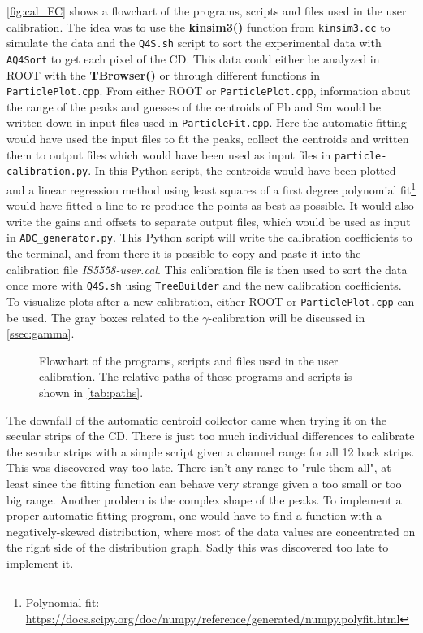 \documentclass[twoside,english]{uiofysmaster/uiofysmaster}
\newcommand{\ga}{$\gamma$}
\let\orgautoref\autoref
\renewcommand{\autoref}
        {%
		 \def\subsectionautorefname{Section}%
		 \def\subsubsectionautorefname{Section}%
          \orgautoref}
\begin{document}
\autoref{fig:cal_FC} shows a flowchart of the programs, scripts and files used in the user calibration. 
The idea was to use the \textbf{kinsim3()} function from \texttt{kinsim3.cc} to simulate the data and the \texttt{Q4S.sh} script to sort the experimental data with \texttt{AQ4Sort} to get each pixel of the CD. 
This data could either be analyzed in ROOT with the \textbf{TBrowser()} or through different functions in \texttt{ParticlePlot.cpp}. 
From either ROOT or \texttt{ParticlePlot.cpp}, information about the range of the peaks and guesses of the centroids of Pb and Sm would be written down in input files used in \texttt{ParticleFit.cpp}. 
Here the automatic fitting would have used the input files to fit the peaks, collect the centroids and written them to output files which would have been used as input files in \texttt{particle-calibration.py}. 
In this Python script, the centroids would have been plotted and a linear regression method using least squares of a first degree polynomial fit\footnote{Polynomial fit: \url{https://docs.scipy.org/doc/numpy/reference/generated/numpy.polyfit.html}} would have fitted a line to re-produce the points as best as possible. 
It would also write the gains and offsets to separate output files, which would be used as input in \texttt{ADC\_generator.py}. 
This Python script will write the calibration coefficients to the terminal, and from there it is possible to copy and paste it into the calibration file \textit{IS5558-user.cal}. 
This calibration file is then used to sort the data once more with \texttt{Q4S.sh} using \texttt{TreeBuilder} and the new calibration coefficients.
To visualize plots after a new calibration, either ROOT or \texttt{ParticlePlot.cpp} can be used. 
The gray boxes related to the \ga-calibration will be discussed in \autoref{ssec:gamma}.

\begin{figure}[ht]
	\centering
	
	\caption{Flowchart of the programs, scripts and files used in the user calibration. The relative paths of these programs and scripts is shown in \autoref{tab:paths}.}
	\label{fig:cal_FC}
\end{figure}

The downfall of the automatic centroid collector came when trying it on the secular strips of the CD. 
There is just too much individual differences to calibrate the secular strips with a simple script given a channel range for all 12 back strips. 
This was discovered way too late. 
There isn't any range to "rule them all", at least since the fitting function can behave very strange given a too small or too big range.
Another problem is the complex shape of the peaks.
To implement a proper automatic fitting program, one would have to find a function with a negatively-skewed distribution, where most of the data values are concentrated on the right side of the distribution graph. 
Sadly this was discovered too late to implement it. 
\end{document}
